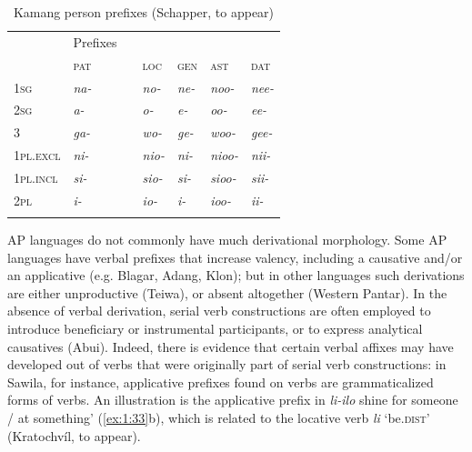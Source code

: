 \begin{table}\centering
\begin{tabular}{lllllll}
\mytoprule
\multicolumn{1}{l}{} & \multicolumn{1}{l}{ Prefixes} & \multicolumn{5}{l}{}\\
& \multicolumn{2}{l}{{\scshape pat}} & {\scshape loc} & {\scshape gen} & \textsc{ast}\footnotemark{} & {\scshape dat}\\
\midrule 
{\scshape 1sg} & \multicolumn{2}{l}{{\itshape na-}

} & {\itshape no-} & {\itshape ne-} & {\itshape noo-} & {\itshape nee-}\\
{\scshape 2sg} & \multicolumn{2}{l}{{\itshape a-}

} & {\itshape o-} & {\itshape e-} & {\itshape oo-} & {\itshape ee-}\\
3 & \multicolumn{2}{l}{{\itshape ga-}

} & {\itshape wo-} & {\itshape ge-} & {\itshape woo-} & {\itshape gee-}\\
{\scshape 1pl.excl} & \multicolumn{2}{l}{{\itshape ni-}

} & {\itshape nio-} & {\itshape ni-} & {\itshape nioo-} & {\itshape nii-}\\
{\scshape 1pl.incl} & \multicolumn{2}{l}{{\itshape si-}

} & {\itshape sio-} & {\itshape si-} & {\itshape sioo-} & {\itshape sii-}\\
{\scshape 2pl} & \multicolumn{2}{l}{{\itshape i-}

} & {\itshape io-} & {\itshape i-} & {\itshape ioo-} & {\itshape ii-}\\
\mybottomrule
\end{tabular}

\caption{ Kamang person prefixes (Schapper, to appear)}
\label{tab:1:9}
\end{table}

AP languages do not commonly have much derivational morphology. Some AP languages have verbal prefixes that increase valency, including a causative and/or an applicative (e.g. Blagar, Adang, Klon); but in other languages such derivations are either unproductive (Teiwa), or absent altogether (Western Pantar). In the absence of verbal derivation, serial verb constructions are often employed to introduce beneficiary or instrumental participants, or to express analytical causatives (Abui). Indeed, there is evidence that certain verbal affixes may have developed out of verbs that were originally part of serial verb constructions: in Sawila, for instance, applicative prefixes found on verbs are grammaticalized forms of verbs. An illustration is the applicative prefix   in \textit{li-ilo} shine for someone / at something' (\ref{ex:1:33}b), which is related to the locative verb \textit{li} `be.\textsc{dist}' (Kratochv\'il, to appear). 


